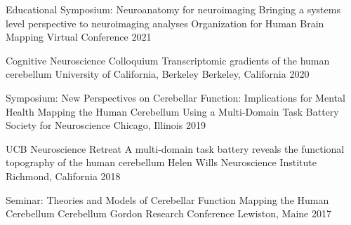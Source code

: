 
\begin{cventries}

  \cventry
    {Educational Symposium: Neuroanatomy for neuroimaging} %
    {Bringing a systems level perspective to neuroimaging analyses} %
    {Organization for Human Brain Mapping} %
    {Virtual Conference} %
    {2021} %
    
  \cventry
    {Cognitive Neuroscience Colloquium} %
    {Transcriptomic gradients of the human cerebellum} %
    {University of California, Berkeley} %
    {Berkeley, California} %
    {2020} %

  \cventry
    {Symposium: New Perspectives on Cerebellar Function: Implications for Mental Health} %
    {Mapping the Human Cerebellum Using a Multi-Domain Task Battery} %
    {Society for Neuroscience} %
    {Chicago, Illinois} %
    {2019} %
    
  \cventry
    {UCB Neuroscience Retreat} %
    {A multi-domain task battery reveals the functional topography of the human cerebellum} %
    {Helen Wills Neuroscience Institute}
    {Richmond, California} %
    {2018} %
    
  \cventry
    {Seminar: Theories and Models of Cerebellar Function} %
    {Mapping the Human Cerebellum} %
    {Cerebellum Gordon Research Conference} %
    {Lewiston, Maine} %
    {2017} %
   
\end{cventries}
